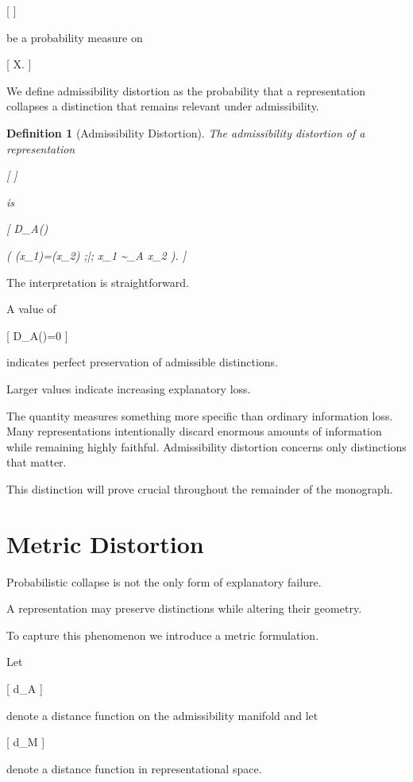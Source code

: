 \documentclass[11pt,oneside,openany]{book}
\newtheorem{definition}{Definition}[chapter] \newtheorem{theorem}{Theorem}[chapter] \newtheorem{proposition}{Proposition}[chapter] \newtheorem{lemma}{Lemma}[chapter] \newtheorem{corollary}{Corollary}[chapter] \newtheorem{remark}{Remark}[chapter]
\begin{document}
[
\mu
]

be a probability measure on

[
\mathcal X.
]

We define admissibility distortion as the probability that a representation collapses a distinction that remains relevant under admissibility.

\begin{definition}[Admissibility Distortion]

The admissibility distortion of a representation

[
\pi
]

is

[
D_A(\pi)

\Pr
\Big(
\pi(x_1)=\pi(x_2)
;\middle|;
x_1 \not\sim_A x_2
\Big).
]

\end{definition}

The interpretation is straightforward.

A value of

[
D_A(\pi)=0
]

indicates perfect preservation of admissible distinctions.

Larger values indicate increasing explanatory loss.

The quantity measures something more specific than ordinary information loss. Many representations intentionally discard enormous amounts of information while remaining highly faithful. Admissibility distortion concerns only distinctions that matter.

This distinction will prove crucial throughout the remainder of the monograph.

\section{Metric Distortion}

Probabilistic collapse is not the only form of explanatory failure.

A representation may preserve distinctions while altering their geometry.

To capture this phenomenon we introduce a metric formulation.

Let

[
d_A
]

denote a distance function on the admissibility manifold and let

[
d_M
]

denote a distance function in representational space.
\end{document}
